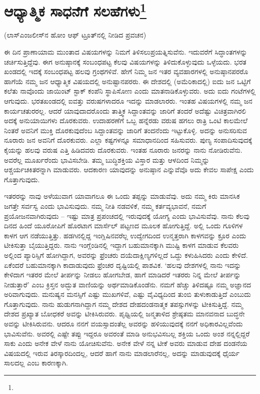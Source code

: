 
\chapter[ಆಧ್ಯಾತ್ಮಿಕ ಸಾಧನೆಗೆ ಸಲಹೆಗಳು]{ಆಧ್ಯಾತ್ಮಿಕ ಸಾಧನೆಗೆ ಸಲಹೆಗಳು\protect\footnote{}}

\begin{center}
(ಲಾಸ್‌ಎಂಜಲೀಸ್‌ನ ಹೋಂ ಆಫ್ ಟ್ರೂತ್‌ನಲ್ಲಿ ನೀಡಿದ ಪ್ರವಚನ)
\end{center}

ಈ ದಿನ ಪ್ರಾಣಾಯಾಮ ಮುಂತಾದ ವಿಷಯಗಳನ್ನು ನಿಮಗೆ ತಿಳಿಸಲು\break ಪ್ರಯತ್ನಿಸುವೆನು. ಇದುವರೆಗೆ ಸಿದ್ಧಾಂತಗಳನ್ನು ಚರ್ಚಿಸುತ್ತಿದ್ದೆವು. ಈಗ ಅನುಷ್ಠಾನಕ್ಕೆ ಸಂಬಂಧಪಟ್ಟ ಕೆಲವು ವಿಷಯಗಳನ್ನು ತಿಳಿದುಕೊಳ್ಳುವುದು ಒಳ್ಳೆಯದು. ಭರತ ಖಂಡದಲ್ಲಿ ಇದಕ್ಕೆ ಸಂಬಂಧಪಟ್ಟ ಹಲವು ಗ್ರಂಥಗಳಿವೆ. ಹೇಗೆ ನಿಮ್ಮ ಜನ ಇತರ ವ್ಯವಹಾರಗಳಲ್ಲಿ ಅನುಷ್ಠಾನಪರರೊ ಹಾಗೆಯೆ ನಮ್ಮ ಜನ ಆಧ್ಯಾತ್ಮಿಕ ವಿಷಯದಲ್ಲಿ ಅನುಷ್ಟಾನಪರರು. ಈ ದೇಶದಲ್ಲಿ (ಅಮೆರಿಕಾದಲ್ಲಿ) ಐದು ಜನ ಒಟ್ಟಿಗೆ ಕಲೆತು ನಾವೊಂದು ಜಾಯಿಂಟ್ ಸ್ಟಾಕ್ ಕಂಪೆನಿ ಸ್ಥಾಪಿಸೋಣ ಎಂದು ಮಾತನಾಡಿಕೊಳ್ಳುವರು. ಅದು ಐದು ಗಂಟೆಗಳಲ್ಲಿ ಆಗುವುದು. ಭರತಖಂಡದಲ್ಲಿ ಐವತ್ತು ವರುಷಗಳಾದರೂ ಇದನ್ನು ಮಾಡಲಾರರು. ಇಂತಹ ವಿಷಯಗಳಲ್ಲಿ ನಮ್ಮ ಜನ ಕಾರ್ಯಚತುರರಲ್ಲ. ಆದರೆ ಯಾವುದಾದರೊಂದು ತಾತ್ತ್ವಿಕ ಸಿದ್ದಾಂತವನ್ನು ಜಾರಿಗೆ ತಂದರೆ ಅದೆಷ್ಟು ವಿಚಿತ್ರವಾಗಿರಲಿ ಅದಕ್ಕೆ ಅನುಯಾಯಿಗಳು ದೊರಕುವರು. ಉದಾಹರಣೆಗೆ ಒಬ್ಬ ಹನ್ನೆರಡು ವರುಷ ಹಗಲು ರಾತ್ರಿ ಒಂಟಿ ಕಾಲಮೇಲೆ ನಿಂತರೆ ಅವನಿಗೆ ಮುಕ್ತಿ ದೊರಕುವುದೆಂಬ ಸಿದ್ದಾಂತವನ್ನು ಜಾರಿಗೆ ತಂದನೆಂದು ಇಟ್ಟುಕೊಳ್ಳಿ. ಅದನ್ನು ಅನುಸರಿಸುವ ನೂರಾರು ಜನ ಅವನಿಗೆ ದೊರಕುವರು. ಎಲ್ಲಾ ಕಷ್ಟಗಳನ್ನೂ ಸಮಾಧಾನದಿಂದ ಸಹಿಸುವರು. ಪುಣ್ಯ ಸಂಪಾದಿಸುವುದಕ್ಕೆ ಕೈಯನ್ನು ಹಲವು ವರುಷ ಎತ್ತಿ ಹಿಡಿದವರು ದೊರಕುವರು. ಇಂತಹ ನೂರಾರು ಜನರನ್ನು ನಾನು ನೋಡಿರುವೆನು. ಅವರೆಲ್ಲ ಮೂರ್ಖರೆಂದು ಭಾವಿಸಬೇಡಿ. ತಮ್ಮ ಬುದ್ಧಿಶಕ್ತಿಯ ವಿಸ್ತಾರ ಮತ್ತು ಆಳದಿಂದ ನಿಮ್ಮನ್ನು ಆಶ್ಚರ್ಯಚಕಿತರನ್ನಾಗಿ ಮಾಡುವರು. ಆದಕಾರಣ ಯಾವುದನ್ನು ಅನುಷ್ಠಾನ ಎನ್ನುವೆವೊ ಅದು ಕೇವಲ ಸಾಪೇಕ್ಷ ಎಂದು ಗೊತ್ತಾಗುವುದು.

ಇತರರನ್ನು ನಾವು ಅಳೆಯುವಾಗ ಯಾವಾಗಲೂ ಈ ಒಂದು ತಪ್ಪನ್ನು ಮಾಡುವೆವು. ಅದು ನಮ್ಮ ಕಿರು ಮಾನಸಿಕ ಜಗತ್ತೇ ಸರ್ವಸ್ವ ಎಂದು ಭಾವಿಸುವುದು. ನಮ್ಮ ನೀತಿ ನಡವಳಿಕೆ, ನಮ್ಮ ಕರ್ತವ್ಯಭಾವನೆ, ನಮಗೆ ಪ್ರಯೋಜನವಾಗಿರುವುದು – ಇಷ್ಟು ಮಾತ್ರ ಪ್ರಪಂಚದಲ್ಲಿ ಇರುವುದಕ್ಕೆ ಯೋಗ್ಯ ಎಂದು ಭಾವಿಸುವೆವು. ನಾನು ಕೆಲವು ದಿನದ ಹಿಂದೆ ಯೂರೋಪಿಗೆ ಹೊರಟಾಗ ಮಾರ್ಸೆಲ್ ಪಟ್ಟಣದ ಮೂಲಕ ಹೋಗುತ್ತಿದ್ದೆ. ಅಲ್ಲಿ ಒಂದು ಗೂಳಿಗಳ ಕಾಳಗ ಆಗ ನಡೆಯುತ್ತಿತ್ತು. ಹಡಗಿನಲ್ಲಿದ್ದ ಇಂಗ್ಲಿಷಿನವರೆಲ್ಲ ಉದ್ವೇಗದಿಂದ ಉನ್ಮತ್ತರಾಗಿ ಕಾಳಗವನ್ನು ಕ್ರೂರ ಎಂದು ಟೀಕಿಸುತ್ತಾ ಬೈಯುತ್ತಿದ್ದರು. ನಾನು ಇಂಗ್ಲೆಂಡಿನಲ್ಲಿ ಇದ್ದಾಗ ಬಹುಮಾನಕ್ಕಾಗಿ ಮುಷ್ಟಿ ಕಾಳಗ ಮಾಡುವ ಕೆಲವರು ಅಲ್ಲಿಂದ ಪ್ಯಾರಿಸ್ಸಿಗೆ ಹೋಗಿದ್ದಾಗ, ಅವರನ್ನು ಫ್ರೆಂಚರು ದಯೆದಾಕ್ಷಿಣ್ಯಗಳಿಲ್ಲದೆ ಒದ್ದು ಕಳುಹಿಸಿದರು ಎಂದು ಕೇಳಿದೆ. ಏಕೆಂದರೆ ಬಹುಮಾನಕ್ಕಾಗಿ ಕಾದಾಡುವುದು ಫ್ರೆಂಚರ ದೃಷ್ಟಿಯಲ್ಲಿ ಪಾಶವಿಕ. `ಹಲವು ದೇಶಗಳಲ್ಲಿ ನಾನು ಇದನ್ನು ಕೇಳಿದಾಗ ಇತರರ ಮೇಲೆ ತೀರ್ಪನ್ನು ನೀಡಲು ಹೋಗಬೇಡ, ಹಾಗೆ ಮಾಡಿದರೆ ಇತರರು ನಿನ್ನ ಮೇಲೆ ತೀರ್ಪನ್ನು ನೀಡುತ್ತಾರೆ' ಎಂಬ ಕ್ರಿಸ್ತನ ಅದ್ಭುತ ವಾಣಿಯನ್ನು ಅರ್ಥಮಾಡಿಕೊಂಡೆನು. ನಮಗೆ ಹೆಚ್ಚು ತಿಳಿದಷ್ಟೂ ನಮ್ಮ ಅಜ್ಞಾನದ ಅರಿವಾಗುವುದು. ಮನುಷ್ಯನ ಮನಸ್ಸಿಗೆ ಎಷ್ಟು ಮುಖಗಳಿವೆ, ಎಷ್ಟು ವೈವಿಧ್ಯದಿಂದ ತುಂಬಿ ತುಳುಕಾಡುತ್ತಿದೆ ಎಂಬುದು ಗೊತ್ತಾಗುವುದು. ನಾನು ಹುಡುಗನಾಗಿದ್ದಾಗ ನಮ್ಮ ದೇಶದ ದೇಹದಂಡನಾತ್ಮಕ ತಪಸ್ಸುಗಳನ್ನು ಟೀಕಿಸುತ್ತಿದ್ದೆ. ನಮ್ಮ ದೇಶದ ಪ್ರಖ್ಯಾತ ಬೋಧಕರೆ ಅವನ್ನು ಟೀಕಿಸಿರುವರು. ಪೃಥ್ವಿಯಲ್ಲಿ ಜನ್ಮತಾಳಿದ ಶ್ರೇಷ್ಠತಮ ಮಾನವನಾದ ಬುದ್ಧನೇ ಅವನ್ನು ಟೀಕಿಸಿರುವನು. ಆದರೂ ನನಗೆ ವಯಸ್ಸಾದಂತೆಲ್ಲ ಅವರನ್ನು ಹಳಿಯುವುದಕ್ಕೆ ನನಗೆ ಅಧಿಕಾರವಿಲ್ಲವೆಂದು ಭಾವಿಸುವೆನು. ಅವರಲ್ಲಿ ಎಷ್ಟೇ ತಪ್ಪು ಇದ್ದರೂ ಅವರಂತೆ ಮಾಡಿ ಅನುಭವಿಸಬಲ್ಲ ಶಕ್ತಿಯ ಒಂದು ಅಂಶ ನನ್ನಲ್ಲಿದ್ದರೆ ಸಾಕು ಎಂದು ಅನೇಕ ವೇಳೆ ನಾನು ಯೋಚಿಸುವೆನು. ಅನೇಕ ವೇಳೆ ನನ್ನ ಟೀಕೆ ಅವರು ಮಾಡುವ ದೇಹ ದಂಡನೆಯ ವಿಷಯದಲ್ಲಿ ಇರುವ ತಿರಸ್ಕಾರದಿಂದಲ್ಲ, ಆದರೆ ಹಾಗೆ ನಾನು ಮಾಡಲಾರೆನಲ್ಲ, ಅದನ್ನು ಮಾಡುವುದಕ್ಕೆ ಧೈರ್ಯ ಸಾಲದಲ್ಲ ಎಂಬ ಕಾರಣಕ್ಕಾಗಿ.

